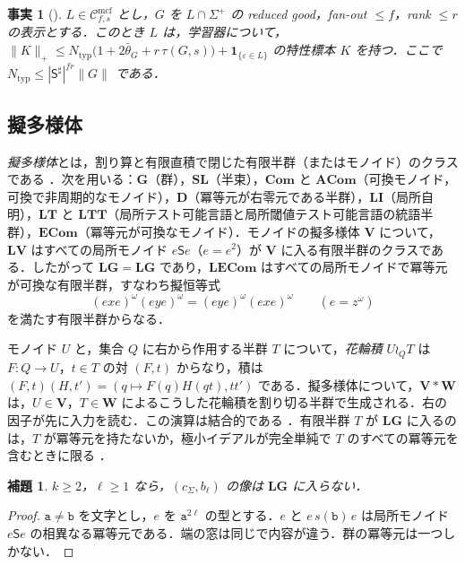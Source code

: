 \documentclass[11pt,a4paper]{ltjsarticle}
\numberwithin{equation}{section}
\theoremstyle{plain}
\newtheorem{lemma}[theorem]{補題}
\newtheorem{fact}[theorem]{事実}
\theoremstyle{definition}
\theoremstyle{remark}
\theoremstyle{plain}
\newcommand{\Cmcf}[2]{\mathcal{C}^{\mathrm{mcf}}_{#1,#2}}
\newcommand{\eps}{\varepsilon}
\newcommand{\LG}{\mathbf{LG}}
\newcommand{\LI}{\mathbf{LI}}
\newcommand{\SL}{\mathbf{SL}}
\newcommand{\Gp}{\mathbf{G}}
\newcommand{\Dd}{\mathbf{D}}
\newcommand{\ECom}{\mathbf{ECom}}
\newcommand{\LECom}{\mathbf{L}\mathbf{ECom}}
\newcommand{\LT}{\mathbf{LT}}
\newcommand{\LTT}{\mathbf{LTT}}
\newcommand{\ACom}{\mathbf{ACom}}
\newcommand{\Com}{\mathbf{Com}}
\newcommand{\bth}{\bar\theta}
\begin{document}
\begin{fact}[{\cite[定理 \textit{data-from-typed-thickness}，系 \textit{distribution-representatives}]{KuriyamaCompendium}}]
\label{fact:char-data}
$L\in\Cmcf{f}{s}$ とし，$G$ を $L\cap\Sigma^+$ の reduced good，fan-out $\le f$，rank $\le r$ の表示とする．このとき $L$ は，学習器について，$\|K\|_+\le N_{\mathrm{typ}}\bigl(1+2\bth_G+r\,\tau(G,s)\bigr)+\mathbf 1_{\{\eps\in L\}}$ の特性標本 $K$ を持つ．ここで $N_{\mathrm{typ}}\le|\mathsf S^\sharp|^{fr}\|G\|$ である．
\end{fact}

\subsection{擬多様体}

\emph{擬多様体}とは，割り算と有限直積で閉じた有限半群（またはモノイド）のクラスである \cite{Pin1986}．次を用いる：$\Gp$（群），$\SL$（半束），$\Com$ と $\ACom$（可換モノイド，可換で非周期的なモノイド），$\Dd$（冪等元が右零元である半群），$\LI$（局所自明），$\LT$ と $\LTT$（局所テスト可能言語と局所閾値テスト可能言語の統語半群），$\ECom$（冪等元が可換なモノイド）．モノイドの擬多様体 $\mathbf V$ について，$\mathbf L\mathbf V$ はすべての局所モノイド $e\mathsf Se$（$e=e^2$）が $\mathbf V$ に入る有限半群のクラスである．したがって $\LG=\mathbf L\Gp$ であり，$\LECom$ はすべての局所モノイドで冪等元が可換な有限半群，すなわち擬恒等式
\[
  (exe)^\omega(eye)^\omega=(eye)^\omega(exe)^\omega\qquad(e=z^\omega)
\]
を満たす有限半群からなる．

モノイド $U$ と，集合 $Q$ に右から作用する半群 $T$ について，\emph{花輪積} $U\wr_QT$ は $F:Q\to U$，$t\in T$ の対 $(F,t)$ からなり，積は $(F,t)(H,t')=(q\mapsto F(q)H(qt),tt')$ である．擬多様体について，$\mathbf V*\mathbf W$ は，$U\in\mathbf V$，$T\in\mathbf W$ によるこうした花輪積を割り切る半群で生成される．右の因子が先に入力を読む．この演算は結合的である \cite{Tilson1987}．有限半群 $T$ が $\LG$ に入るのは，$T$ が冪等元を持たないか，極小イデアルが完全単純で $T$ のすべての冪等元を含むときに限る \cite[命題2.1]{CostaNogueiraTeixeira2021}．

\begin{lemma}
\label{lem:window-not-lg}
$k\ge2$，$\ell\ge1$ なら，$(c_\Sigma,b_\ell)$ の像は $\LG$ に入らない．
\end{lemma}

\begin{proof}
$\mathtt a\ne\mathtt b$ を文字とし，$e$ を $\mathtt a^{2\ell}$ の型とする．$e$ と $e\,s(\mathtt b)\,e$ は局所モノイド $e\mathsf Se$ の相異なる冪等元である．端の窓は同じで内容が違う．群の冪等元は一つしかない．
\end{proof}
\end{document}
